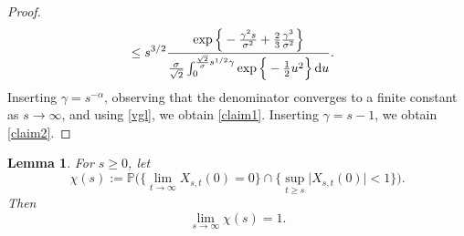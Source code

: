 \documentclass[sn-mathphys-num]{sn-jnl}
\newtheorem{lem}[thm]{Lemma}
\theoremstyle{definition}
\newcommand{\scr}[1]{\mathscr #1}
\numberwithin{equation}{section} \theoremstyle{remark}
\renewcommand{\d}{\hbox{d}}
\def\d{\text{\rm{d}}} \def\bb{\beta} \def\aa{\alpha} \def\D{\scr D}
\def\P{\mathbb P}
\newcommand{\1}{\mathbbm{1}}
\begin{document}
\begin{proof}
\begin{align*}
                          &\leq s^{3/2}\frac{\exp\Big\{-\frac {\gamma^2s}{\sigma^2}+\frac 23 \frac {\gamma^3}{\sigma^2}\Big\}}{\frac{\sigma}{\sqrt{2}} \int_0^{\frac {\sqrt{2}}\sigma s^{1/2}\gamma} \exp\Big\{-\frac 1 2 u^2\Big\}\,\d u}.
\end{align*}
Inserting $\gamma=s^{-\alpha}$, observing that the denominator converges to a finite constant as $s \to \infty$, and using \eqref{vgl},  we obtain   \eqref{claim1}.
Inserting $\gamma=s-1$, we obtain \eqref{claim2}.
\end{proof}

\begin{lem}\label{gegennull}
  For $s \geq 0$,   let
  $$
  \chi(s):=\P\big(\big\{\lim_{t \to \infty} X_{s,t}(0)=0\big\}\cap \big\{\sup_{t \geq s}\big|X_{s,t}(0)\big|<1\big\}\big).
  $$
  Then
  $$
  \lim_{s \to \infty}\chi(s)=1.
  $$
\end{lem}
\end{document}
